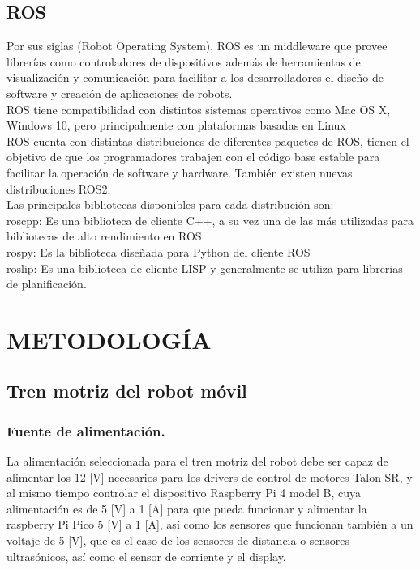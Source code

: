 \documentclass[12pt]{book} %
\begin{document}
	\section{ROS}
Por sus siglas (Robot Operating System), ROS es un middleware que provee librerías como controladores de dispositivos además de herramientas de visualización y comunicación  para facilitar a los desarrolladores el diseño de software y creación de aplicaciones de robots.\\
ROS tiene compatibilidad con distintos sistemas operativos como Mac OS X, Windows 10, pero principalmente con plataformas basadas en Linux\\
ROS cuenta con distintas distribuciones de diferentes paquetes de ROS, tienen el objetivo de que los programadores trabajen con el código base estable para facilitar la operación de software y hardware. También existen nuevas distribuciones ROS2.\\
Las principales bibliotecas disponibles para cada distribución son:\\
roscpp: Es una biblioteca de cliente C++, a su vez una de las más utilizadas para bibliotecas de alto rendimiento en ROS\\
rospy: Es la biblioteca diseñada para Python del cliente ROS\\
roslip:  Es una biblioteca de cliente LISP y generalmente se utiliza para librerias de planificación.\\


\chapter{METODOLOGÍA} \label{METODOLOGÍA}

\section{Tren motriz del robot móvil} %
 \lhead[]{}
	\subsection{Fuente de alimentación.}
La alimentación seleccionada para el tren motriz del robot debe ser capaz de alimentar los 12 [V] necesarios para los drivers de control de motores Talon SR, y al mismo tiempo controlar el dispositivo Raspberry Pi 4 model B, cuya alimentación es de 5 [V] a 1 [A] para que pueda funcionar y alimentar la raspberry Pi Pico 5 [V] a 1 [A], así como los sensores que funcionan también a un voltaje de 5 [V], que es el caso de los sensores de distancia o sensores ultrasónicos, así como el sensor de corriente y el display.\\
\end{document}
